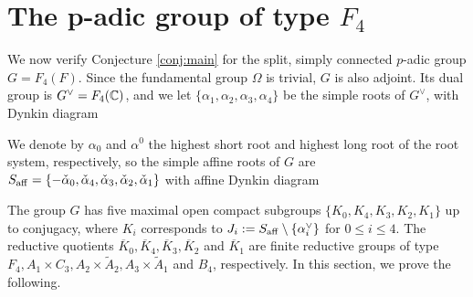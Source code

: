 \section{The p-adic group of type \texorpdfstring{$F_4$}{PDFstring}}\label{sec:F4}

We now verify Conjecture \ref{conj:main} for the split, simply connected $p$-adic group $G=F_4(F)$. Since the fundamental group $\Omega$ is trivial, $G$ is also adjoint. Its dual group is $G^\vee=F_4(\mathbb{C})$, and we let $\{\alpha_1,\alpha_2,\alpha_3,\alpha_4\}$ be the simple roots of $G^\vee$, with Dynkin diagram 

\begin{center}
\end{center}
We denote by $\alpha_0$ and $\alpha^0$ the highest short root and highest long root of the root system, respectively, so the simple affine roots of $G$ are $S_{\mathrm{aff}}=\{-\check{\alpha}_0,\check{\alpha}_4,\check{\alpha}_3,\check{\alpha}_2,\check{\alpha}_1\}$ with affine Dynkin diagram 
\begin{center}
\end{center}

The group $G$ has five maximal open compact subgroups $\{K_0,K_4,K_3,K_2,K_1\}$ up to conjugacy, where $K_i$ corresponds to $J_i:=S_{\mathrm{aff}}\setminus\{\alpha^\vee_i\}$ for $0\leq i\leq 4$. The reductive quotients $\overline{K}_0,\overline{K}_4,\overline{K}_3,\overline{K}_2$ and $\overline{K}_1$ are finite reductive groups of type $F_4, A_1\times C_3, A_2\times\tilde{A}_2, A_3\times\tilde{A}_1$ and $B_4$, respectively. In this section, we prove the following.

